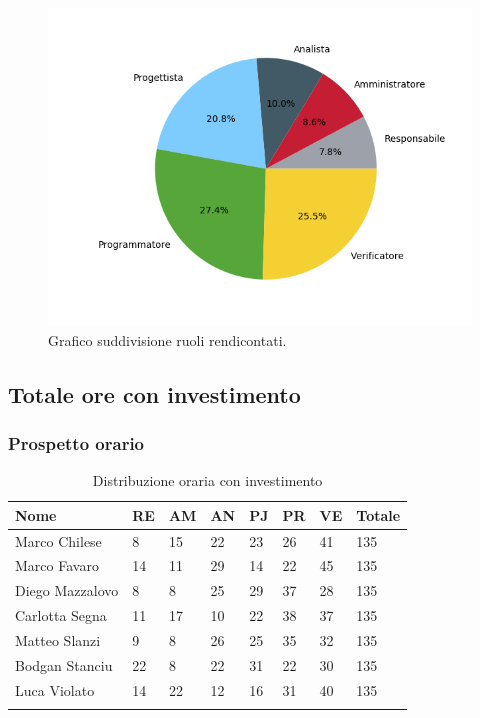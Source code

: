 \begin{figure}[H]
	\centering
  		\includegraphics[width=0.8\linewidth]{./images/torta_to.png}
  		\caption{Grafico suddivisione ruoli rendicontati.}
  		\label{fig:grafico suddivione ruoli}
\end{figure}



\subsection{Totale ore con investimento}
\subsubsection{Prospetto orario}


\begin{longtable}{|C{.30\textwidth}|C{.06\textwidth}|C{.06\textwidth}|C{.06\textwidth} | C{.06\textwidth}| C{.06\textwidth} | C{.06\textwidth} | C{.10\textwidth} |}
\hline
\textbf{Nome} & \textbf{RE} & \textbf{AM} & \textbf{AN} & \textbf{PJ} & \textbf{PR} & \textbf{VE} & \textbf{Totale}\\
\hline 
Marco Chilese & 8 & 15 & 22 & 23 & 26 & 41 & 135\\
\hline
Marco Favaro & 14 & 11 & 29 & 14 & 22 & 45 & 135\\
\hline
Diego Mazzalovo & 8 & 8 & 25 & 29 & 37 & 28 & 135\\
\hline
Carlotta Segna & 11 & 17 & 10 & 22 & 38 & 37 & 135\\
\hline
Matteo Slanzi & 9 & 8 & 26 & 25 & 35 & 32 & 135\\
\hline
Bodgan Stanciu & 22 & 8 & 22 & 31 & 22 & 30 & 135\\
\hline
Luca Violato & 14 & 22 & 12 & 16 & 31 & 40 & 135 \\
\hline


\caption{Distribuzione oraria con investimento}
\label{Distribuzione oraria delle ore con investimento}
\end{longtable}

